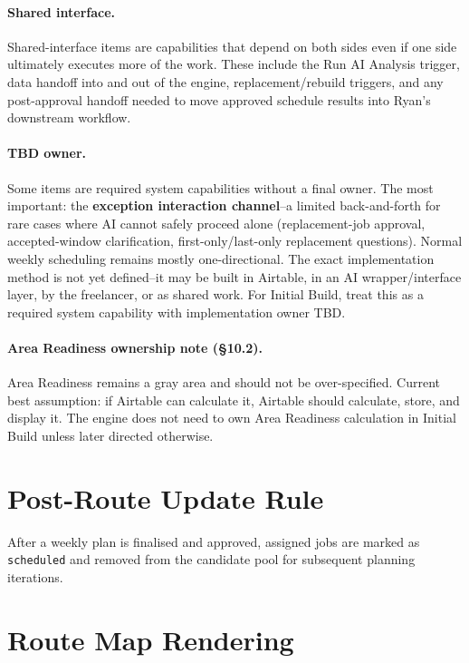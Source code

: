 \documentclass[12pt]{article}
\begin{document}
\paragraph{Shared interface.}
Shared-interface items are capabilities that depend on both sides even if one side ultimately executes more of the work.
These include the Run AI Analysis trigger, data handoff into and out of the engine, replacement/rebuild triggers, and any post-approval handoff needed to move approved schedule results into Ryan's downstream workflow.

\paragraph{TBD owner.}
Some items are required system capabilities without a final owner.
The most important: the \textbf{exception interaction channel}--a limited back-and-forth for rare cases where AI cannot safely proceed alone (replacement-job approval, accepted-window clarification, first-only/last-only replacement questions).
Normal weekly scheduling remains mostly one-directional.
The exact implementation method is not yet defined--it may be built in Airtable, in an AI wrapper/interface layer, by the freelancer, or as shared work.
For Initial Build, treat this as a required system capability with implementation owner TBD.

\paragraph{Area Readiness ownership note (\S10.2).}
Area Readiness remains a gray area and should not be over-specified.
Current best assumption: if Airtable can calculate it, Airtable should calculate, store, and display it.
The engine does not need to own Area Readiness calculation in Initial Build unless later directed otherwise.

\section*{Post-Route Update Rule}

After a weekly plan is finalised and approved, assigned jobs are marked as \texttt{scheduled} and removed from the candidate pool for subsequent planning iterations.

\section*{Route Map Rendering}
\label{sec:mapping}
\end{document}
